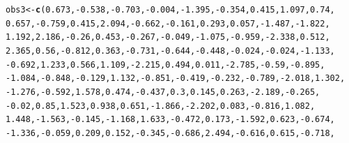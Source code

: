 \documentclass{report}\usepackage[]{graphicx}\usepackage[]{color}
\makeatletter
\newcommand{\hlnum}[1]{\textcolor[rgb]{0.686,0.059,0.569}{#1}}%
\newcommand{\hlopt}[1]{\textcolor[rgb]{0,0,0}{#1}}%
\newcommand{\hlstd}[1]{\textcolor[rgb]{0.345,0.345,0.345}{#1}}%
\newcommand{\hlkwb}[1]{\textcolor[rgb]{0.69,0.353,0.396}{#1}}%
\newcommand{\hlkwd}[1]{\textcolor[rgb]{0.737,0.353,0.396}{\textbf{#1}}}%
\newenvironment{kframe}{%
 \def\at@end@of@kframe{}%
 \ifinner\ifhmode%
  \def\at@end@of@kframe{\end{minipage}}%
  \begin{minipage}{\columnwidth}%
 \fi\fi%
 \def\FrameCommand##1{\hskip\@totalleftmargin \hskip-\fboxsep
 \colorbox{shadecolor}{##1}\hskip-\fboxsep
     \hskip-\linewidth \hskip-\@totalleftmargin \hskip\columnwidth}%
 \MakeFramed {\advance\hsize-\width
   \@totalleftmargin\z@ \linewidth\hsize
   \@setminipage}}%
 {\par\unskip\endMakeFramed%
 \at@end@of@kframe}
\newenvironment{knitrout}{}{} %
\makeatother
\begin{document}
\begin{knitrout}
\begin{kframe}
\begin{alltt}
\hlstd{obs3} \hlkwb{<-} \hlkwd{c}\hlstd{(}\hlnum{0.673}\hlstd{,} \hlopt{-}\hlnum{0.538}\hlstd{,} \hlopt{-}\hlnum{0.703}\hlstd{,} \hlopt{-}\hlnum{0.004}\hlstd{,} \hlopt{-}\hlnum{1.395}\hlstd{,} \hlopt{-}\hlnum{0.354}\hlstd{,} \hlnum{0.415}\hlstd{,} \hlnum{1.097}\hlstd{,} \hlnum{0.74}\hlstd{,}
    \hlnum{0.657}\hlstd{,} \hlopt{-}\hlnum{0.759}\hlstd{,} \hlnum{0.415}\hlstd{,} \hlnum{2.094}\hlstd{,} \hlopt{-}\hlnum{0.662}\hlstd{,} \hlopt{-}\hlnum{0.161}\hlstd{,} \hlnum{0.293}\hlstd{,} \hlnum{0.057}\hlstd{,} \hlopt{-}\hlnum{1.487}\hlstd{,} \hlopt{-}\hlnum{1.822}\hlstd{,}
    \hlnum{1.192}\hlstd{,} \hlnum{2.186}\hlstd{,} \hlopt{-}\hlnum{0.26}\hlstd{,} \hlnum{0.453}\hlstd{,} \hlopt{-}\hlnum{0.267}\hlstd{,} \hlopt{-}\hlnum{0.049}\hlstd{,} \hlopt{-}\hlnum{1.075}\hlstd{,} \hlopt{-}\hlnum{0.959}\hlstd{,} \hlopt{-}\hlnum{2.338}\hlstd{,} \hlnum{0.512}\hlstd{,}
    \hlnum{2.365}\hlstd{,} \hlnum{0.56}\hlstd{,} \hlopt{-}\hlnum{0.812}\hlstd{,} \hlnum{0.363}\hlstd{,} \hlopt{-}\hlnum{0.731}\hlstd{,} \hlopt{-}\hlnum{0.644}\hlstd{,} \hlopt{-}\hlnum{0.448}\hlstd{,} \hlopt{-}\hlnum{0.024}\hlstd{,} \hlopt{-}\hlnum{0.024}\hlstd{,} \hlopt{-}\hlnum{1.133}\hlstd{,}
    \hlopt{-}\hlnum{0.692}\hlstd{,} \hlnum{1.233}\hlstd{,} \hlnum{0.566}\hlstd{,} \hlnum{1.109}\hlstd{,} \hlopt{-}\hlnum{2.215}\hlstd{,} \hlnum{0.494}\hlstd{,} \hlnum{0.011}\hlstd{,} \hlopt{-}\hlnum{2.785}\hlstd{,} \hlopt{-}\hlnum{0.59}\hlstd{,} \hlopt{-}\hlnum{0.895}\hlstd{,}
    \hlopt{-}\hlnum{1.084}\hlstd{,} \hlopt{-}\hlnum{0.848}\hlstd{,} \hlopt{-}\hlnum{0.129}\hlstd{,} \hlnum{1.132}\hlstd{,} \hlopt{-}\hlnum{0.851}\hlstd{,} \hlopt{-}\hlnum{0.419}\hlstd{,} \hlopt{-}\hlnum{0.232}\hlstd{,} \hlopt{-}\hlnum{0.789}\hlstd{,} \hlopt{-}\hlnum{2.018}\hlstd{,} \hlnum{1.302}\hlstd{,}
    \hlopt{-}\hlnum{1.276}\hlstd{,} \hlopt{-}\hlnum{0.592}\hlstd{,} \hlnum{1.578}\hlstd{,} \hlnum{0.474}\hlstd{,} \hlopt{-}\hlnum{0.437}\hlstd{,} \hlnum{0.3}\hlstd{,} \hlnum{0.145}\hlstd{,} \hlnum{0.263}\hlstd{,} \hlopt{-}\hlnum{2.189}\hlstd{,} \hlopt{-}\hlnum{0.265}\hlstd{,}
    \hlopt{-}\hlnum{0.02}\hlstd{,} \hlnum{0.85}\hlstd{,} \hlnum{1.523}\hlstd{,} \hlnum{0.938}\hlstd{,} \hlnum{0.651}\hlstd{,} \hlopt{-}\hlnum{1.866}\hlstd{,} \hlopt{-}\hlnum{2.202}\hlstd{,} \hlnum{0.083}\hlstd{,} \hlopt{-}\hlnum{0.816}\hlstd{,} \hlnum{1.082}\hlstd{,}
    \hlnum{1.448}\hlstd{,} \hlopt{-}\hlnum{1.563}\hlstd{,} \hlopt{-}\hlnum{0.145}\hlstd{,} \hlopt{-}\hlnum{1.168}\hlstd{,} \hlnum{1.633}\hlstd{,} \hlopt{-}\hlnum{0.472}\hlstd{,} \hlnum{0.173}\hlstd{,} \hlopt{-}\hlnum{1.592}\hlstd{,} \hlnum{0.623}\hlstd{,} \hlopt{-}\hlnum{0.674}\hlstd{,}
    \hlopt{-}\hlnum{1.336}\hlstd{,} \hlopt{-}\hlnum{0.059}\hlstd{,} \hlnum{0.209}\hlstd{,} \hlnum{0.152}\hlstd{,} \hlopt{-}\hlnum{0.345}\hlstd{,} \hlopt{-}\hlnum{0.686}\hlstd{,} \hlnum{2.494}\hlstd{,} \hlopt{-}\hlnum{0.616}\hlstd{,} \hlnum{0.615}\hlstd{,} \hlopt{-}\hlnum{0.718}\hlstd{,}

\end{alltt}
\end{kframe}
\end{knitrout}
\end{document}
